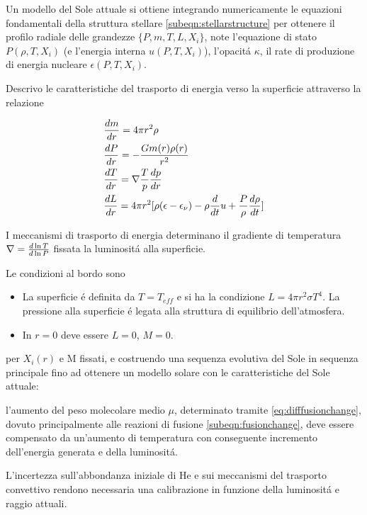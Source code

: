\documentclass[../main.tex]{subfiles}
\begin{document}
Un modello del Sole attuale si ottiene integrando numericamente le equazioni fondamentali della struttura stellare \eqref{subeqn:stellarstructure} per ottenere il profilo radiale delle grandezze $\{P,m,T,L,X_i\}$, note  l'equazione di stato $P(\rho,T,X_i)$ (e l'energia interna $u(P,T,X_i)$), l'opacit\'a $\kappa$, il rate di produzione di energia nucleare $\epsilon(P,T,X_i)$.

Descrivo le caratteristiche del trasporto di energia verso la superficie attraverso la relazione

\begin{subequations}\label{subeqn:stellarstructure}
\begin{align}
&\TDy{r}{m}=4\pi r^2\rho\\
&\TDy{r}{P}=-\frac{Gm(r)\rho(r)}{r^2}\\
&\TDy{r}{T}=\nabla\frac{T}{p}\TDy{r}{p}\\
&\TDy{r}{L}=4\pi r^2[\rho(\epsilon-\epsilon_{\nu})-\rho\TDof{t}u+\frac{P}{\rho}\TDy{t}{\rho}]
\end{align}
\end{subequations}

I meccanismi di trasporto di energia determinano il gradiente di temperatura $\nabla=\TDly{P}{T}$ fissata la luminosit\'a alla superficie.

Le condizioni al bordo sono
\begin{itemize}
    \item La superficie \'e definita da $T=T_{eff}$ e si ha la condizione $L=4\pi r^2\sigma T^4$. La pressione alla superficie \'e legata alla struttura di equilibrio dell'atmosfera.
    \item In $r=0$ deve essere $L=0$, $M=0$.
\end{itemize}
per $X_i(r)$ e M fissati, e costruendo una sequenza evolutiva del Sole in sequenza principale fino ad ottenere un modello solare con le caratteristiche del Sole attuale:

l'aumento del peso molecolare medio $\mu$, determinato tramite \eqref{eq:difffusionchange}, dovuto principalmente alle reazioni di fusione \eqref{subeqn:fusionchange}, deve essere compensato da un'aumento di temperatura con conseguente incremento dell'energia generata e della luminosit\'a.

L'incertezza sull'abbondanza iniziale di He e sui meccanismi del trasporto convettivo rendono necessaria una calibrazione in funzione della luminosit\'a e raggio attuali.
\end{document}
